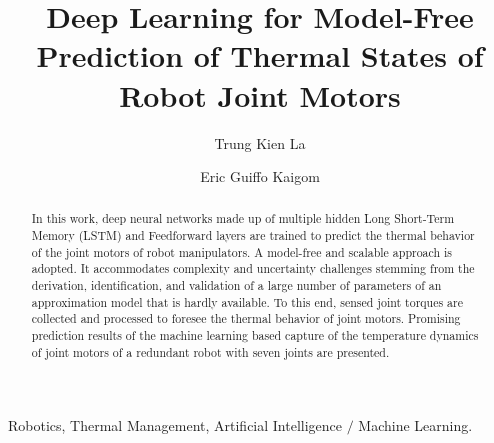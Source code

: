 \documentclass{ifacconf}
\begin{document}
\begin{frontmatter}

\title{Deep Learning for Model-Free Prediction of  Thermal States of Robot Joint Motors} 


\author[First]{Trung Kien La} 
\author[First]{Eric Guiffo Kaigom} 

\address[First]{Department of Computer Science \& Engineering,
Frankfurt University of Applied Sciences, 60318 Frankfurt am Main, Germany (e-mails: trung.la@stud.fra-uas.de; kaigom@fb2.fra-uas.de).}

\begin{abstract}                %
	In this work, deep neural networks made up of multiple hidden Long Short-Term Memory (LSTM) and Feedforward  layers are trained to predict the  thermal behavior of the joint motors of robot manipulators. A model-free and scalable approach  is adopted. It accommodates   complexity and uncertainty challenges stemming from the derivation, identification, and validation of a large number of  parameters of an approximation model that is hardly available. To this end, sensed joint torques are  collected  and processed  to foresee the thermal behavior of joint motors. Promising prediction results of the machine learning based capture of the temperature dynamics of joint motors of a redundant robot with seven joints are presented. 
\end{abstract}

\begin{keyword}
Robotics, Thermal Management, Artificial Intelligence $\slash$ Machine Learning.
\end{keyword}

\end{frontmatter}
\end{document}
